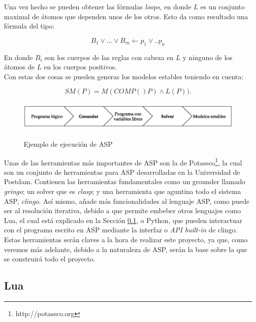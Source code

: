 Una vez hecho se pueden obtener las fórmulas \textit{loops}, en donde $L$ es un conjunto maximal de átomos que dependen unos de los otros. Esto da como resultado una fórmula del tipo:

\begin{equation*}
	B_1 \lor ... \lor B_m \leftarrow p_1 \lor .. p_n
\end{equation*}

En donde $B_i$ son los cuerpos de las reglas con cabeza en $L$ y ninguno de los átomos de $L$ en los cuerpos positivos. \\

Con estas dos cosas se pueden generas los modelos estables teniendo en cuenta:

\begin{equation}
	SM(P) = M(COMP()P) \land L(P)).
\end{equation}

\begin{figure}[h]
	\centering
	\includegraphics[height=4em]{images/ASP}
	\label{fig:asp}
	\caption{Ejemplo de ejecución de ASP}
\end{figure}

Unas de las herramientas más importantes de ASP son la de Potassco\footnote{http://potassco.org}, la cual son un conjunto de herramientas para ASP desarrolladas en la Universidad de Postdam. Contienen las herramientas fundamentales como un grounder llamado \textit{gringo}; un solver que es \textit{clasp}; y una herramienta que aguntina todo el sistema ASP, \textit{clingo}. Así mismo, añade más funcionalidades al lenguaje ASP, como puede ser al resolución iterativa, debido a que permite embeber otros lenguajes como Lua, el cual está explicado en la Sección \ref{subsec:lua}, o Python, que pueden interactuar con el programa escrito en ASP mediante la interfaz o \textit{API built-in} de clingo. \\

Estas herramientas serán claves a la hora de realizar este proyecto, ya que, como veremos más adelante, debido a la naturaleza de ASP, serán la base sobre la que se construirá todo el proyecto.

\subsection{Lua}\label{subsec:lua}

